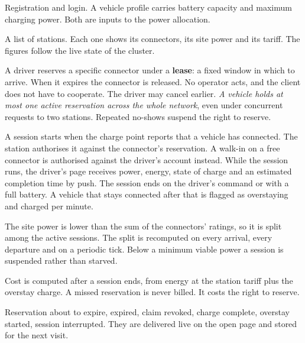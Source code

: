 \begin{description}[leftmargin=0pt, itemsep=3pt, font=\normalfont\itshape]
  \item[Account and vehicle.] Registration and login. A vehicle profile carries battery
        capacity and maximum charging power. Both are inputs to the power allocation.
  \item[Station discovery.] A list of stations. Each one shows its connectors, its site
        power and its tariff. The figures follow the live state of the cluster.
  \item[Reservation.] A driver reserves a specific connector under a \textbf{lease}: a fixed
        window in which to arrive. When it expires the connector is released. No operator
        acts, and the client does not have to cooperate. The driver may cancel earlier.
        \emph{A vehicle holds at most one active reservation across the whole network}, even
        under concurrent requests to two stations. Repeated no-shows suspend the right to
        reserve.
  \item[Charging session.] A session starts when the charge point reports that a vehicle has
        connected. The station authorises it against the connector's reservation. A walk-in
        on a free connector is authorised against the driver's account instead. While the
        session runs, the driver's page receives power, energy, state of charge and an
        estimated completion time by push. The session ends on the driver's command or with
        a full battery. A vehicle that stays connected after that is flagged as overstaying
        and charged per minute.
  \item[Power allocation.] The site power is lower than the sum of the connectors' ratings,
        so it is split among the active sessions. The split is recomputed on every arrival,
        every departure and on a periodic tick. Below a minimum viable power a session is
        suspended rather than starved.
  \item[Billing and history.] Cost is computed after a session ends, from energy at the
        station tariff plus the overstay charge. A missed reservation is never billed. It
        costs the right to reserve.
  \item[Notifications.] Reservation about to expire, expired, claim revoked, charge
        complete, overstay started, session interrupted. They are delivered live on the open
        page and stored for the next visit.
\end{description}

